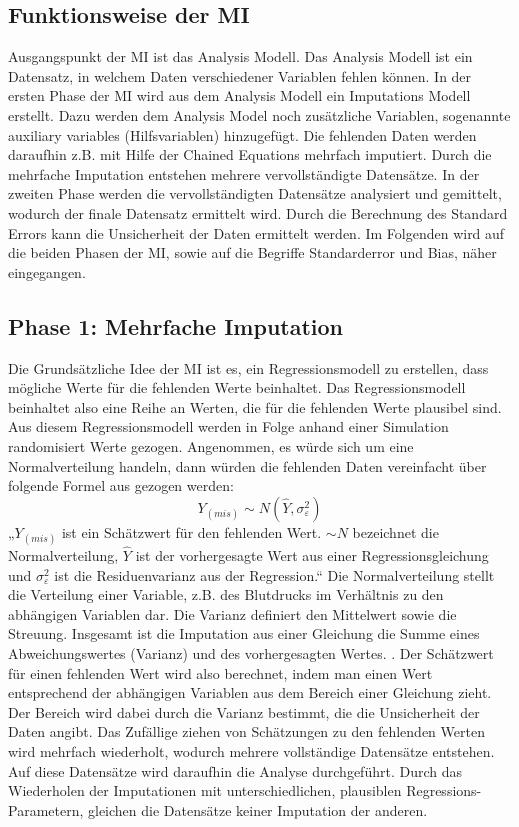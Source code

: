 \subsection{Funktionsweise der MI}

Ausgangspunkt der MI ist das Analysis Modell. Das Analysis Modell ist ein Datensatz, in welchem Daten verschiedener Variablen 
fehlen können. In der ersten Phase der MI wird aus dem Analysis Modell ein Imputations Modell erstellt. Dazu werden dem 
Analysis Model noch zusätzliche Variablen, sogenannte auxiliary variables (Hilfsvariablen) hinzugefügt. Die fehlenden 
Daten werden daraufhin z.B. mit Hilfe der Chained Equations mehrfach imputiert. Durch die mehrfache Imputation entstehen 
mehrere vervollständigte Datensätze. In der zweiten Phase werden die vervollständigten Datensätze analysiert und gemittelt, 
wodurch der finale Datensatz ermittelt wird. Durch die Berechnung des Standard Errors kann die Unsicherheit der Daten 
ermittelt werden. \autocite[163]{Lee2014} Im Folgenden wird auf die beiden Phasen der MI, sowie auf die Begriffe Standarderror und Bias, näher eingegangen.

\subsection{Phase 1: Mehrfache Imputation}

Die Grundsätzliche Idee der MI ist es, ein Regressionsmodell zu erstellen, dass mögliche Werte für die fehlenden Werte 
beinhaltet. Das Regressionsmodell beinhaltet also eine Reihe an Werten, die für die fehlenden Werte plausibel sind.
Aus diesem Regressionsmodell werden in Folge anhand einer Simulation randomisiert Werte gezogen. Angenommen, es 
würde sich um eine Normalverteilung handeln, dann würden die fehlenden Daten vereinfacht über folgende Formel aus \textcite[8]{Enders2017} gezogen werden:
\begin{equation}
 Y_{(mis)}\sim N(\widehat{Y}, \sigma_\varepsilon^2)
\end{equation}
„$Y_{(mis)}$ ist ein Schätzwert für den fehlenden Wert. $\sim N$ bezeichnet die Normalverteilung, $\widehat{Y}$ ist der vorhergesagte Wert aus 
einer Regressionsgleichung und $\sigma_\varepsilon^2$ ist die Residuenvarianz aus der Regression.“ \autocite[8]{Enders2017}  Die Normalverteilung
stellt die Verteilung einer Variable, z.B. des Blutdrucks im Verhältnis zu den abhängigen Variablen dar. Die Varianz definiert den Mittelwert sowie die Streuung. 
Insgesamt ist die Imputation aus einer Gleichung die Summe eines Abweichungswertes 
(Varianz) und des vorhergesagten Wertes. \autocite[8]{Enders2017}. Der Schätzwert für einen fehlenden Wert wird also berechnet, indem man einen 
Wert entsprechend der abhängigen Variablen aus dem Bereich einer Gleichung zieht. Der Bereich wird dabei durch die Varianz bestimmt, die die Unsicherheit der Daten angibt.
Das Zufällige ziehen von Schätzungen zu den fehlenden Werten wird mehrfach wiederholt, wodurch mehrere vollständige 
Datensätze entstehen. Auf diese Datensätze wird daraufhin die Analyse durchgeführt. \autocite[163 ff.]{Lee2014} Durch das 
Wiederholen der Imputationen mit unterschiedlichen, plausiblen Regressions-Parametern, gleichen die Datensätze keiner 
Imputation der anderen. \autocite[8]{Enders2017} 

